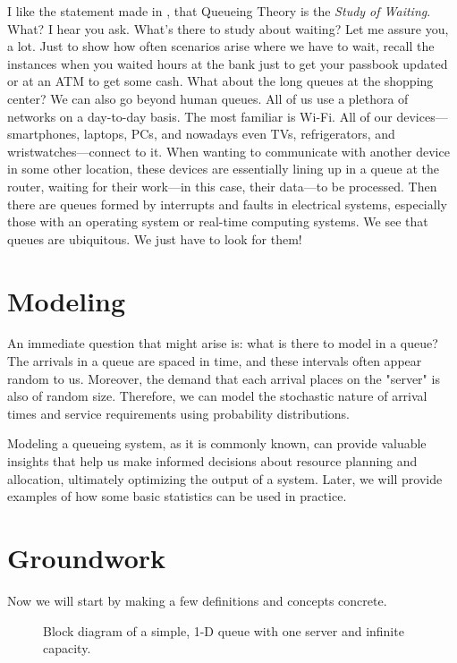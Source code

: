\documentclass[11pt, a4paper]{report}
\begin{document}
I like the statement made in \cite{RobertazziQ}, that Queueing Theory is the \emph{Study of Waiting}. What? I hear you ask. What's there to study about waiting? Let me assure you, a lot. Just to show how often scenarios arise where we have to wait, recall the instances when you waited hours at the bank just to get your passbook updated or at an ATM to get some cash. What about the long queues at the shopping center? We can also go beyond human queues. All of us use a plethora of networks on a day-to-day basis. The most familiar is Wi-Fi. All of our devices—smartphones, laptops, PCs, and nowadays even TVs, refrigerators, and wristwatches—connect to it. When wanting to communicate with another device in some other location, these devices are essentially lining up in a queue at the router, waiting for their work—in this case, their data—to be processed. Then there are queues formed by interrupts and faults in electrical systems, especially those with an operating system or real-time computing systems. We see that queues are ubiquitous. We just have to look for them!  

\section{Modeling}
An immediate question that might arise is: what is there to model in a queue? The arrivals in a queue are spaced in time, and these intervals often appear random to us. Moreover, the demand that each arrival places on the "server" is also of random size. Therefore, we can model the stochastic nature of arrival times and service requirements using probability distributions.

Modeling a queueing system, as it is commonly known, can provide valuable insights that help us make informed decisions about resource planning and allocation, ultimately optimizing the output of a system. Later, we will provide examples of how some basic statistics can be used in practice.

\section{Groundwork}
Now we will start by making a few definitions and concepts concrete. 

\begin{figure}
    \centering
    
    \caption{Block diagram of a simple, 1-D queue with one server and infinite capacity.}
    \label{fig:simpleQblk}
\end{figure}
\end{document}
